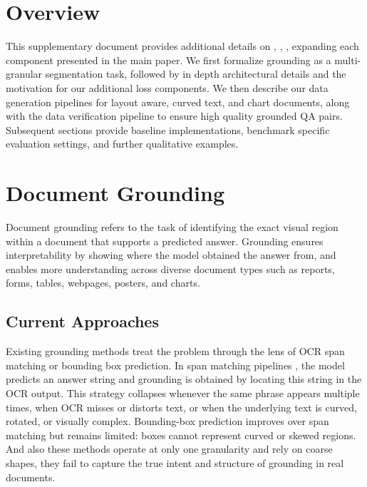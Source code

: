 \clearpage
\section{Overview}
This supplementary document provides additional details on  \modelName, \datasetName, \benchmarkName, expanding each component presented in the main paper. We first formalize grounding as a multi-granular segmentation task, followed by in depth architectural details and the motivation for our additional loss components. We then describe our data generation pipelines for layout aware, curved text, and chart documents, along with the data  verification pipeline to ensure high quality grounded QA pairs. Subsequent sections provide baseline implementations, benchmark specific evaluation settings, and further qualitative examples. 

\section{Document Grounding}

Document grounding refers to the task of identifying the exact visual region within a document that supports a predicted answer. 
Grounding ensures interpretability by showing where the model obtained the answer from, and enables more understanding across diverse document types such as reports, forms, tables, webpages, posters, and charts.

\subsection{Current Approaches}
Existing grounding methods treat the problem through the lens of OCR span matching or bounding box prediction. In span matching pipelines
, the model predicts an answer string and grounding is obtained by locating this string in the OCR output. This strategy collapses whenever the same phrase appears multiple times, when OCR misses or distorts text, or when the underlying text is curved, rotated, or visually complex. Bounding-box prediction improves over span matching but remains limited: boxes cannot represent curved or skewed regions. And also these methods operate at only one granularity and rely on coarse shapes, they fail to capture the true intent and structure of grounding in real documents.

